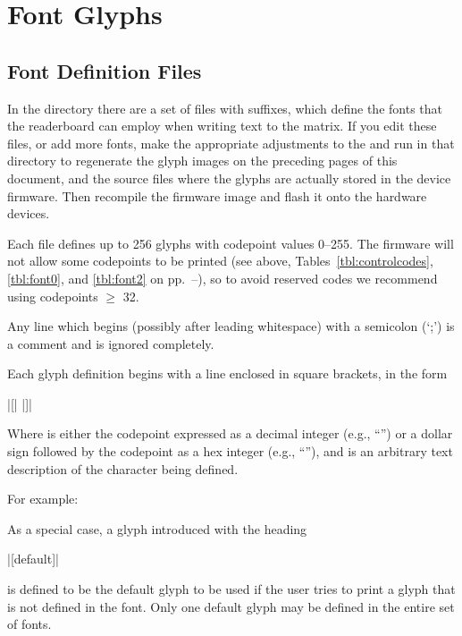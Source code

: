 \chapter{Font Glyphs}\label{chap:fonts}

\section{Font Definition Files}
In the  directory there are a set of files with  suffixes,
which define the fonts that the readerboard can employ when writing text to the matrix.
If you edit these files, or add more fonts, make the appropriate adjustments to the
 and run  in that directory to regenerate the glyph images on the
preceding pages of this document, and the source files where the glyphs are actually
stored in the device firmware. Then recompile the firmware image and flash it onto
the hardware devices.

Each file defines up to 256 glyphs with codepoint values 0--255. The firmware will not
allow some codepoints to be printed (see above, Tables~\ref{tbl:controlcodes}, \ref{tbl:font0}, and \ref{tbl:font2} on pp.~\pageref{tbl:controlcodes}--\pageref{tbl:font2}), so to avoid reserved codes we recommend using codepoints $\ge$ 32. 

Any line which begins (possibly after leading whitespace) with a semicolon (`\z;') is a comment and is ignored completely.

Each glyph definition begins with a line enclosed in square brackets, in the form
\begin{center}
	\begin{Coding}
		|[| |]|
	\end{Coding}
\end{center}
Where  is either the codepoint expressed as a decimal integer (e.g., ``'') or
a dollar sign followed by the codepoint as a hex integer (e.g., ``''), and
 is an arbitrary text description of the character being defined.

For example:

As a special case, a glyph introduced with the heading
\begin{center}
	\begin{Coding}
		|[default]|
	\end{Coding}
\end{center}
is defined to be the default glyph to be used if the user
tries to print a glyph that is not defined in the font. Only
one default glyph may be defined in the entire set of fonts.

